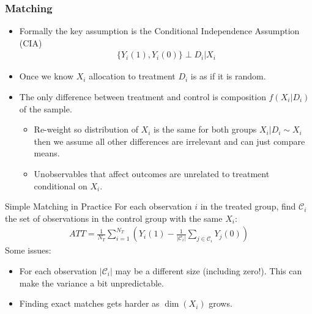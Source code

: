 \documentclass[aspectratio=169,11pt]{beamer}
\begin{document}
\begin{frame}
\frametitle{Matching}
\begin{itemize}
\item Formally the key assumption is the \alert{Conditional Independence Assumption (CIA)}
\begin{eqnarray*}
\{Y_i(1),Y_i(0)\}  \perp D_i | X_i
\end{eqnarray*}
\item Once we know $X_i$ allocation to treatment $D_i$ is as if it is random.
\item The only difference between treatment and control is composition $f(X_i | D_i)$ of the sample.
\begin{itemize}
\item Re-weight so distribution of $X_i$ is the same for both groups $ X_i | D_i \sim X_i$ then we assume all other differences are irrelevant and can just compare means.
\item Unobservables that affect outcomes are \alert{unrelated to treatment} conditional on $X_i$.
\end{itemize}
\end{itemize}
\end{frame}

\begin{frame}{Simple Matching in Practice}
For each observation $i$ in the \alert{treated group}, find $\mathcal{C}_i$ the set of observations in the \alert{control group} with the same $X_i$:
\begin{align*}
ATT = \frac{1}{N_T} \sum_{i=1}^{N_T}\left(Y_i(1)-\frac{1}{|\mathcal{C}_i|} \sum_{j \in \mathcal{C}_i} Y_j(0)\right)
\end{align*}
Some issues:
\begin{itemize}
	\item For each observation $|\mathcal{C}_i|$ may be a different size (including zero!). This can make the variance a bit unpredictable.	
	\item Finding \alert{exact matches} gets harder as $\dim(X_i)$ grows.
\end{itemize}
\end{frame}
\end{document}
